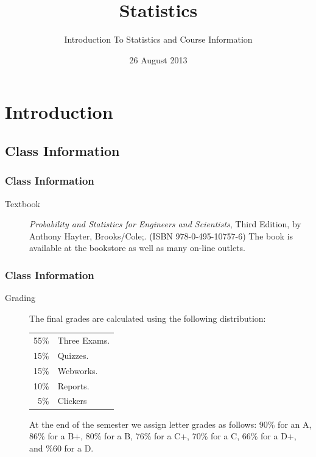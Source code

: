 
\section{Introduction}

\title{Statistics}
\subtitle{Introduction To Statistics and Course Information}

\date{26 August 2013}

\begin{frame}
  \titlepage
\end{frame}



\subsection{Class Information}


\begin{frame}
  \frametitle{Class Information}

\begin{description}
\item[Textbook] {\em Probability and Statistics for Engineers and
    Scientists}, Third Edition, by Anthony Hayter, Brooks/Cole;. (ISBN
  978-0-495-10757-6) The book is available at the bookstore as well as
  many on-line outlets.

\end{description}

\end{frame}


\begin{frame}
  \frametitle{Class Information}

\begin{description}
\item[Grading] %
  
  The final grades are calculated using the following distribution:
    \begin{tabular}[t]{rl}
      55\% & Three Exams. \\
      15\% & Quizzes. \\
      15\% & Webworks. \\
      10\% & Reports. \\
      5\%  & Clickers
    \end{tabular}

  
    At the end of the semester we assign letter grades as follows:
    90\% for an A, 86\% for a B+, 80\% for a B, 76\% for a C+, 70\%
    for a C, 66\% for a D+, and \%60 for a D.

\end{description}

\end{frame}




